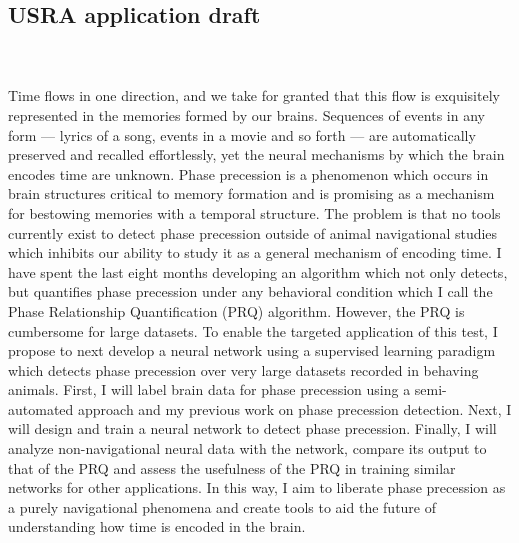 \documentclass[12pt, letterpaper]{article}
\begin{document}
\begin{center}
    {\section*{\normalfont\normalsize\bf USRA application draft}}
\end{center}
\\
\\

Time flows in one direction, and we take for granted that this flow is exquisitely represented in the memories formed by our brains. Sequences of events in any form — lyrics of a song, events in a movie and so forth — are automatically preserved and recalled effortlessly, yet the neural mechanisms by which the brain encodes time are unknown. Phase precession is a phenomenon which occurs in brain structures critical to memory formation and is promising as a mechanism for bestowing memories with a temporal structure. The problem is that no tools currently exist to detect phase precession outside of animal navigational studies which inhibits our ability to study it as a general mechanism of encoding time. I have spent the last eight months developing an algorithm which not only detects, but quantifies phase precession under any behavioral condition which I call the Phase Relationship Quantification (PRQ) algorithm. However, the PRQ is cumbersome for large datasets. To enable the targeted application of this test, I propose to next develop a neural network using a supervised learning paradigm which detects phase precession over very large datasets recorded in behaving animals. First, I will label brain data for phase precession using a semi-automated approach and my previous work on phase precession detection. Next, I will design and train a neural network to detect phase precession. Finally, I will analyze non-navigational neural data with the network, compare its output to that of the PRQ and assess the usefulness of the PRQ in training similar networks for other applications. In this way, I aim to liberate phase precession as a purely navigational phenomena and create tools to aid the future of understanding how time is encoded in the brain.\\

\\
\\
\end{document}
